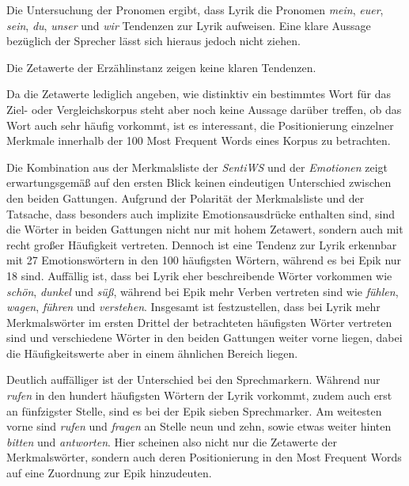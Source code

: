 \documentclass[a4paper,10p]{article}
\begin{document}
Die Untersuchung der Pronomen ergibt, dass Lyrik die Pronomen \textit{mein}, \textit{euer}, \textit{sein}, \textit{du}, \textit{unser} und \textit{wir} Tendenzen zur Lyrik aufweisen. Eine klare Aussage bezüglich der Sprecher lässt sich hieraus jedoch nicht ziehen. \par 

Die Zetawerte der Erzählinstanz zeigen keine klaren Tendenzen. \par

Da die Zetawerte lediglich angeben, wie distinktiv ein bestimmtes Wort für das Ziel- oder Vergleichskorpus steht aber noch keine Aussage darüber treffen, ob das Wort auch sehr häufig vorkommt, ist es interessant, die Positionierung einzelner Merkmale innerhalb der 100 Most Frequent Words eines Korpus zu betrachten.\par 

Die Kombination aus der Merkmalsliste der \textit{SentiWS} und der \textit{Emotionen} zeigt erwartungsgemäß auf den ersten Blick keinen eindeutigen Unterschied zwischen den beiden Gattungen. Aufgrund der Polarität der Merkmalsliste und der Tatsache, dass besonders auch implizite Emotionsausdrücke enthalten sind, sind die Wörter in beiden Gattungen nicht nur mit hohem Zetawert, sondern auch mit recht großer Häufigkeit vertreten. Dennoch ist eine Tendenz zur Lyrik erkennbar mit 27 Emotionswörtern in den 100 häufigsten Wörtern, während es bei Epik nur 18 sind. Auffällig ist, dass bei Lyrik eher beschreibende Wörter vorkommen wie \textit{schön}, \textit{dunkel} und \textit{süß}, während bei Epik mehr Verben vertreten sind wie \textit{fühlen}, \textit{wagen}, \textit{führen} und \textit{verstehen}. Insgesamt ist festzustellen, dass bei Lyrik mehr Merkmalswörter im ersten Drittel der betrachteten häufigsten Wörter vertreten sind und verschiedene Wörter in den beiden Gattungen weiter vorne liegen, dabei die Häufigkeitswerte aber in einem ähnlichen Bereich liegen. \par 

Deutlich auffälliger ist der Unterschied bei den Sprechmarkern. Während nur \textit{rufen} in den hundert häufigsten Wörtern der Lyrik vorkommt, zudem auch erst an fünfzigster Stelle, sind es bei der Epik sieben Sprechmarker. Am weitesten vorne sind \textit{rufen} und \textit{fragen} an Stelle neun und zehn, sowie etwas weiter hinten \textit{bitten} und \textit{antworten}. Hier scheinen also nicht nur die Zetawerte der Merkmalswörter, sondern auch deren Positionierung in den Most Frequent Words auf eine Zuordnung zur Epik hinzudeuten. 
\end{document}
